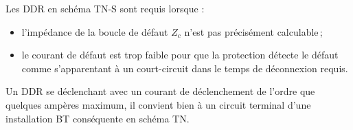 Les DDR en schéma TN-S sont requis lorsque :
\begin{itemize}
\item l'impédance de la boucle de défaut $Z_c$ n'est pas précisément calculable\,;
\item le courant de défaut est trop faible pour que la protection détecte le défaut comme s'apparentant à un court-circuit dans le temps de déconnexion requis.
\end{itemize}

Un DDR se déclenchant avec un courant de déclenchement de l'ordre que quelques ampères maximum, il convient bien à un circuit terminal d'une installation BT conséquente en schéma TN.



